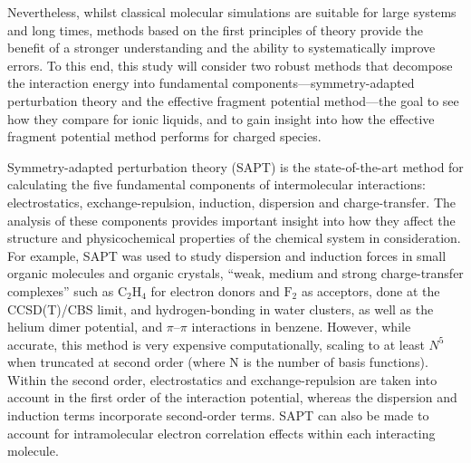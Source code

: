 Nevertheless, whilst classical molecular simulations are suitable for large systems and long times, methods based on the first principles of theory provide the benefit of a stronger understanding and the ability to systematically improve errors.
To this end, this study will consider two robust methods that decompose the interaction energy into fundamental components---symmetry-adapted perturbation theory and the effective fragment potential method---the goal to see how they compare for ionic liquids, and to gain insight into how the effective fragment potential method performs for charged species.


Symmetry-adapted perturbation theory (SAPT)
\cite{Misquitta2008a, Misquitta2008b, Parker2014a}
is the state-of-the-art method for calculating the five fundamental components of intermolecular interactions: electrostatics, exchange-repulsion, induction, dispersion and charge-transfer.
The analysis of these components provides important insight into how they affect the structure and physicochemical properties of the chemical system in consideration.
\cite{Stone1996a, Turney2012a}
For example, SAPT was used to study dispersion
\cite{Misquitta2005a} and
induction forces in small organic molecules and organic crystals,
\cite{Misquitta2008a, Misquitta2008b, Welch2008a}
``weak, medium and strong charge-transfer complexes'' such as $\text{C}_2\text{H}_4$ for electron donors and $\text{F}_2$ as acceptors, done at the CCSD(T)/CBS limit,
\cite{Karthikeyan2011a}
and hydrogen-bonding in water clusters,
\cite{Milet1999a} 
as well as the helium dimer potential,
\cite{Korona1997a}
and $\pi \text{--} \pi$ interactions in benzene.
\cite{Sinnokrot2004a, Sinnokrot2006a}
However, while accurate, this method is very expensive computationally, scaling to at least $N^5$ when truncated at second order (where N is the number of basis functions).
Within the second order, electrostatics and exchange-repulsion are taken into account in the first order of the interaction potential, whereas the dispersion and induction terms incorporate second-order terms. SAPT can also be made to account for intramolecular electron correlation effects within each interacting molecule.



